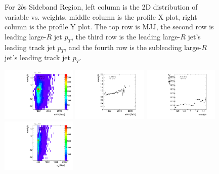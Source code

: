 \begin{figure}[htbp!]
\begin{center}
\caption{For 2$b$s Sideband Region, left column is the 2D distribution of variable vs. weights, middle column is the profile X plot, right column is the profile Y plot. The top row is MJJ, the second row is leading large-$R$ jet $p_{T}$, the third row is the leading large-$R$ jet's leading track jet $p_{T}$, and the fourth row is the subleading large-$R$ jet's leading track jet $p_{T}$.}
\label{fig:app-reweight-dist-2b-SB}
\end{center}
\end{figure}


\begin{figure}[htbp!]
\begin{center}
\includegraphics[angle=270, width=0.32\textwidth]{./figures/boosted/AppendixReweight/Weights/3Trk_Sideband_mHH_l_weight.pdf}
\includegraphics[angle=270, width=0.32\textwidth]{./figures/boosted/AppendixReweight/Weights/3Trk_Sideband_mHH_l_weight_profx.pdf}
\includegraphics[angle=270, width=0.32\textwidth]{./figures/boosted/AppendixReweight/Weights/3Trk_Sideband_mHH_l_weight_profy.pdf}\\
\includegraphics[angle=270, width=0.32\textwidth]{./figures/boosted/AppendixReweight/Weights/3Trk_Sideband_leadHCand_Pt_m_weight.pdf}

\end{center}
\end{figure}
